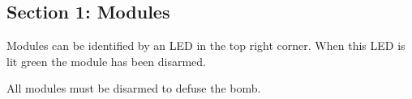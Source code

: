 \documentclass{../../ktane-mod}
\begin{document}

\clearpage
\vspace*{0.33\textheight}

\begin{center}
  \begin{minipage}{\textwidth}
    \begin{minipage}[t]{0.65\textwidth}
      \setlength{\parskip}{10pt}
      \begin{center}
        \section*{Section 1: Modules}
        
        Modules can be identified by an LED in the top right corner.
        When this LED is lit green the module has been disarmed.

        All modules must be disarmed to defuse the bomb.
      \end{center}
    \end{minipage}%
    \hfill%
    \begin{minipage}[t]{0.3\textwidth}
      \centering
    \end{minipage}
  \end{minipage}
\end{center}

\cleardoublepage
\end{document}

